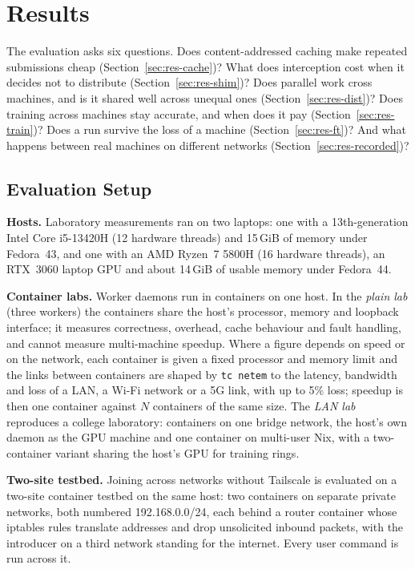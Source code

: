 \chapter{Results}
\label{chap:results}

The evaluation asks six questions. Does content-addressed caching make repeated
submissions cheap (Section~\ref{sec:res-cache})? What does interception cost
when it decides not to distribute (Section~\ref{sec:res-shim})? Does parallel
work cross machines, and is it shared well across unequal ones
(Section~\ref{sec:res-dist})? Does training across machines stay accurate, and
when does it pay (Section~\ref{sec:res-train})? Does a run survive the loss of a
machine (Section~\ref{sec:res-ft})? And what happens between real machines on
different networks (Section~\ref{sec:res-recorded})?

\section{Evaluation Setup}
\label{sec:res-setup}

\textbf{Hosts.} Laboratory measurements ran on two laptops: one with a
13th-generation Intel Core i5-13420H (12 hardware threads) and 15\,GiB of memory
under Fedora~43, and one with an AMD Ryzen~7 5800H (16 hardware threads), an
RTX~3060 laptop GPU and about 14\,GiB of usable memory under Fedora~44.

\textbf{Container labs.} Worker daemons run in containers on one host.
In the \emph{plain lab} (three workers) the containers share the host's
processor, memory and loopback interface; it measures correctness, overhead,
cache behaviour and fault handling, and cannot measure multi-machine speedup.
Where a figure depends on speed or on the network, each container is given a
fixed processor and memory limit and the links between containers are shaped by
\texttt{tc netem} to the latency, bandwidth and loss of a LAN, a Wi-Fi network
or a 5G link, with up to 5\% loss; speedup is then one container against $N$
containers of the same size. The \emph{LAN lab} reproduces a college
laboratory: containers on one bridge network, the host's own daemon as the GPU
machine and one container on multi-user Nix, with a two-container variant
sharing the host's GPU for training rings.

\textbf{Two-site testbed.} Joining across networks without Tailscale is
evaluated on a two-site container testbed on the same host: two containers on
separate private networks, both numbered 192.168.0.0/24, each behind a router
container whose iptables rules translate addresses and drop unsolicited inbound
packets, with the introducer on a third network standing for the internet. Every
user command is run across it.

